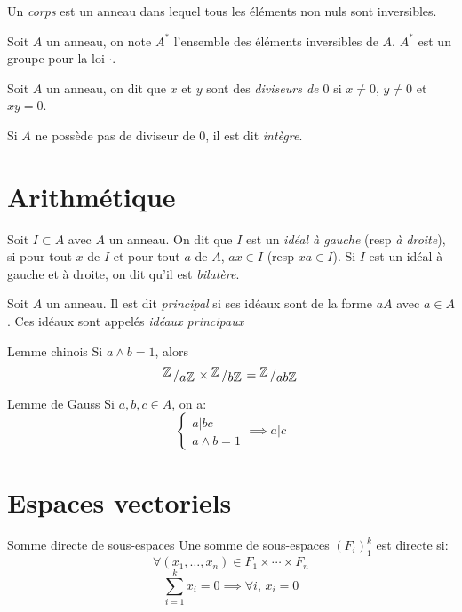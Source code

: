 \documentclass[french, a4paper, 11pt, twocolumn]{article}
\newcommand{\bigslant}[2]{{\raisebox{.2em}{$#1$}\left/\raisebox{-.2em}{$#2$}\right.}}
\newcommand{\Z}{\mathbb{Z}}   %
\begin{document}
\begin{definition}
  Un \emph{corps} est un anneau dans lequel tous les éléments non nuls sont inversibles.

  Soit $A$ un anneau, on note $A^{*}$ l'ensemble des éléments inversibles de $A$. $A^{*}$ est un groupe pour la loi $\cdot$.
\end{definition}

\begin{definition}
  Soit $A$ un anneau, on dit que $x$ et $y$ sont des \emph{diviseurs de $0$} si $x\neq 0$, $y\neq 0$ et $xy=0$.

  Si $A$ ne possède pas de diviseur de $0$, il est dit \emph{intègre}.
\end{definition}

\section{Arithmétique}
\begin{definition}
  Soit $I\subset A$ avec $A$ un anneau. On dit que $I$ est un \emph{idéal à gauche} (resp \emph{à droite}), si pour tout $x$ de $I$ et pour tout $a$ de $A$, $ax\in I$ (resp $xa \in I$). Si $I$ est un idéal à gauche et à droite, on dit qu'il est \emph{bilatère}.
\end{definition}

\begin{definition}
  Soit $A$ un anneau. Il est dit \emph{principal} si ses idéaux sont de la forme $aA$ avec $a\in A$. Ces idéaux sont appelés \emph{idéaux principaux}
\end{definition}

\begin{theoreme}{Lemme chinois}
  Si $a \wedge b = 1$, alors
  \[\bigslant{\Z}{a\Z}\times\bigslant{\Z}{b\Z} = \bigslant{\Z}{ab\Z}\]
\end{theoreme}

\begin{theoreme}{Lemme de Gauss}
  Si $a,b,c\in A$, on a:
  \[\begin{cases}
      a|bc\\
      a\wedge b = 1
    \end{cases}\implies a|c\]
\end{theoreme}

\section{Espaces vectoriels}
\begin{theoreme}{Somme directe de sous-espaces}
  Une somme de sous-espaces $(F_{i})_{1}^{k}$ est directe si:
  \[\forall (x_{1},\ldots,x_{n}) \in F_{1}\times \cdots\times F_{n}\]
  \[\sum_{i=1}^k x_{i} = 0 \implies \forall i,\, x_{i}=0\]
\end{theoreme}
\end{document}
